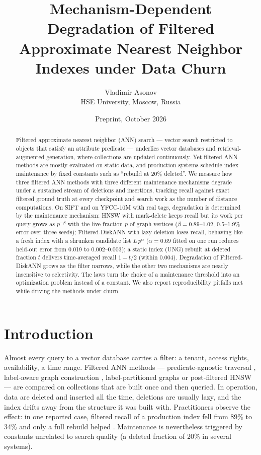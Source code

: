 \documentclass[10pt,a4paper]{article}
\title{Mechanism-Dependent Degradation of Filtered Approximate Nearest Neighbor Indexes under Data Churn}
\author{Vladimir Asonov\\\small HSE University, Moscow, Russia}
\date{Preprint, October 2026}
\begin{document}
\maketitle

\begin{abstract}
Filtered approximate nearest neighbor (ANN) search --- vector search restricted to objects that satisfy an attribute predicate --- underlies vector databases and retrieval-augmented generation, where collections are updated continuously. Yet filtered ANN methods are mostly evaluated on static data, and production systems schedule index maintenance by fixed constants such as ``rebuild at 20\% deleted''. We measure how three filtered ANN methods with three different maintenance mechanisms degrade under a sustained stream of deletions and insertions, tracking recall against exact filtered ground truth at every checkpoint and search work as the number of distance computations. On SIFT and on YFCC-10M with real tags, degradation is determined by the maintenance mechanism: HNSW with mark-delete keeps recall but its work per query grows as $p^{-\beta}$ with the live fraction $p$ of graph vertices ($\beta = 0.89$--$1.02$, 0.5--1.9\% error over three seeds); Filtered-DiskANN with lazy deletion loses recall, behaving like a fresh index with a shrunken candidate list $L\,p^{\alpha}$ ($\alpha = 0.69$ fitted on one run reduces held-out error from 0.019 to 0.002--0.003); a static index (UNG) rebuilt at deleted fraction $t$ delivers time-averaged recall $1 - t/2$ (within 0.004). Degradation of Filtered-DiskANN grows as the filter narrows, while the other two mechanisms are nearly insensitive to selectivity. The laws turn the choice of a maintenance threshold into an optimization problem instead of a constant. We also report reproducibility pitfalls met while driving the methods under churn.
\end{abstract}

\section{Introduction}

Almost every query to a vector database carries a filter: a tenant, access rights, availability, a time range. Filtered ANN methods --- predicate-agnostic traversal \cite{acorn}, label-aware graph construction \cite{filtereddiskann}, label-partitioned graphs \cite{ung} or post-filtered HNSW \cite{hnsw} --- are compared on collections that are built once and then queried. In operation, data are deleted and inserted all the time, deletions are usually lazy, and the index drifts away from the structure it was built with. Practitioners observe the effect: in one reported case, filtered recall of a production index fell from 89\% to 34\% and only a full rebuild helped \cite{qdrant}. Maintenance is nevertheless triggered by constants unrelated to search quality (a deleted fraction of 20\% in several systems).
\end{document}
